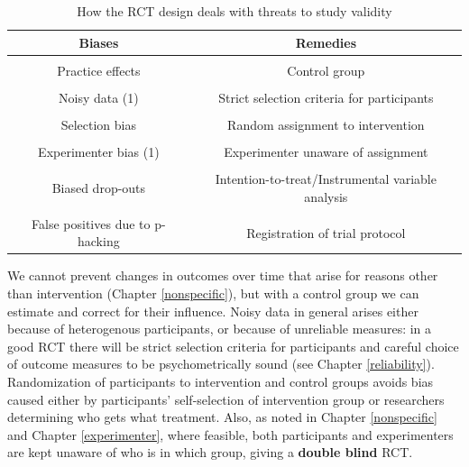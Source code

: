 \documentclass{krantz}
\begin{document}
\begin{table}

\caption{\label{tab:rctchart}How the RCT design deals with threats to study validity}
\centering
\begin{tabular}[t]{cc}
\toprule
Biases & Remedies\\
\midrule
\cellcolor{gray!6}{Spontaneous improvement} & \cellcolor{gray!6}{Control group}\\
Practice effects & Control group\\
\cellcolor{gray!6}{Regression to the mean} & \cellcolor{gray!6}{Control group}\\
Noisy data (1) & Strict selection criteria for participants\\
\cellcolor{gray!6}{Noisy data (2)} & \cellcolor{gray!6}{Outcomes with low measurement error}\\
\addlinespace
Selection bias & Random assignment to intervention\\
\cellcolor{gray!6}{Placebo effects} & \cellcolor{gray!6}{Participant unaware of assignment}\\
Experimenter bias (1) & Experimenter unaware of assignment\\
\cellcolor{gray!6}{Experimenter bias (2)} & \cellcolor{gray!6}{Strictly specified protocol}\\
Biased drop-outs & Intention-to-treat/Instrumental variable analysis\\
\addlinespace
\cellcolor{gray!6}{Low power} & \cellcolor{gray!6}{A priori power analysis}\\
False positives due to p-hacking & Registration of trial protocol\\
\bottomrule
\end{tabular}
\end{table}

We cannot prevent changes in outcomes over time that arise for reasons other than intervention (Chapter \ref{nonspecific}), but with a control group we can estimate and correct for their influence. Noisy data in general arises either because of heterogenous participants, or because of unreliable measures: in a good RCT there will be strict selection criteria for participants and careful choice of outcome measures to be psychometrically sound (see Chapter \ref{reliability}). Randomization of participants to intervention and control groups avoids bias caused either by participants' self-selection of intervention group or researchers determining who gets what treatment. Also, as noted in Chapter \ref{nonspecific} and Chapter \ref{experimenter}, where feasible, both participants and experimenters are kept unaware of who is in which group, giving a \textbf{double blind} RCT.
\end{document}

